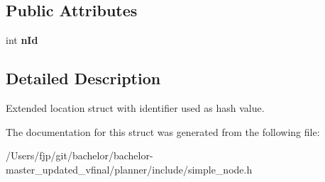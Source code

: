 \subsection*{Public Attributes}
\begin{DoxyCompactItemize}
\item 
\mbox{\label{structplanner_1_1t_simple_location_aa587a447cbe2af93dce4dedd14ac0b1c}} 
int {\bfseries n\+Id}
\end{DoxyCompactItemize}


\subsection{Detailed Description}
Extended location struct with identifier used as hash value. 

The documentation for this struct was generated from the following file\+:\begin{DoxyCompactItemize}
\item 
/\+Users/fjp/git/bachelor/bachelor-\/master\+\_\+updated\+\_\+vfinal/planner/include/simple\+\_\+node.\+h\end{DoxyCompactItemize}
